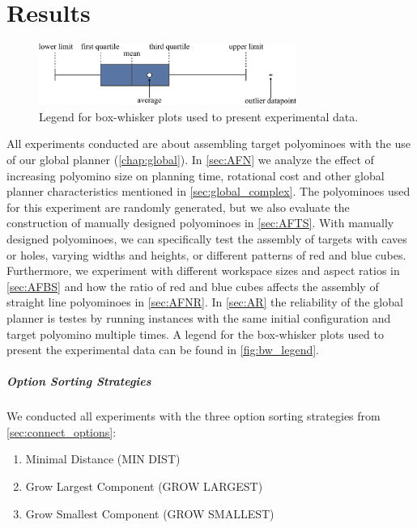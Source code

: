 \chapter{Results}
\label{chap:results}

\begin{figure}
	\centering
	\includegraphics[width=0.75\textwidth]{figures/plots/box_whisker_legend.pdf}
	\caption[Legend for box-whisker plots]{Legend for box-whisker plots used to present experimental data.}
	\label{fig:bw_legend}
\end{figure}

All experiments conducted are about assembling target polyominoes with the use of our global planner (\autoref{chap:global}).
In \autoref{sec:AFN} we analyze the effect of increasing polyomino size on planning time, rotational cost and other global planner characteristics mentioned in \autoref{sec:global_complex}.
The polyominoes used for this experiment are randomly generated, but we also evaluate the construction of manually designed polyominoes in \autoref{sec:AFTS}.
With manually designed polyominoes, we can specifically test the assembly of targets with caves or holes, varying widths and heights, or different patterns of red and blue cubes. 
Furthermore, we experiment with different workspace sizes and aspect ratios in \autoref{sec:AFBS} and how the ratio of red and blue cubes affects the assembly of straight line polyominoes in \autoref{sec:AFNR}.
In \autoref{sec:AR} the reliability of the global planner is testes by running instances with the same initial configuration and target polyomino multiple times.
A legend for the box-whisker plots used to present the experimental data can be found in \autoref{fig:bw_legend}.

\paragraph{Option Sorting Strategies}
We conducted all experiments with the three option sorting strategies from \autoref{sec:connect_options}:
\begin{enumerate}
	\item Minimal Distance (MIN DIST)
	\item Grow Largest Component (GROW LARGEST)
	\item Grow Smallest Component (GROW SMALLEST)
\end{enumerate}

